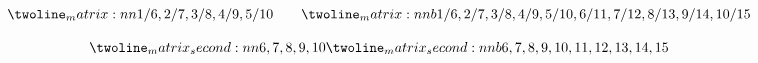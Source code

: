\documentclass{article}
\begin{document}
\[
\twolinematrix{1/6, 2/7, 3/8, 4/9, 5/10}
\qquad
\twolinematrix[b]{
1/6, 2/7, 3/8, 4/9, 5/10,
6/11, 7/12, 8/13, 9/14, 10/15
}
\]

\[
\twolinematrixsecond{6, 7, 8, 9, 10}
\twolinematrixsecond[b]{
6, 7, 8, 9, 10,
11, 12, 13, 14, 15
}
\]
\end{document}
